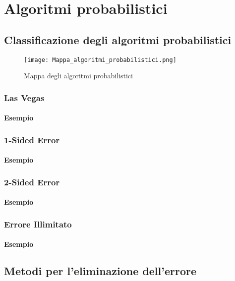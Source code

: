 \documentclass[\main/main.tex]{subfiles}
\begin{document}
\chapter{Algoritmi probabilistici}
\section{Classificazione degli algoritmi probabilistici}
\begin{figure}
  \texttt{[image: Mappa\_algoritmi\_probabilistici.png]}
  \caption{Mappa degli algoritmi probabilistici}
\end{figure}
\subsection{Las Vegas}
\subsubsection{Esempio}
\subsection{1-Sided Error}
\subsubsection{Esempio}
\subsection{2-Sided Error}
\subsubsection{Esempio}
\subsection{Errore Illimitato}
\subsubsection{Esempio}

\section{Metodi per l'eliminazione dell'errore}
\end{document}
